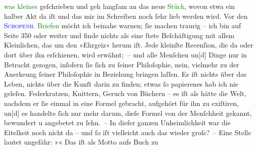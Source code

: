                   \textcolor{green}{was kleines}{} geſchrieben und
               geh langſam an das neue \textcolor{green}{Stück}{},
               wovon etwa ein halber Akt da iſt und das mir im Schreiben noch ſehr lieb werden
               wird.\pend
           \pstart
           {\pb}Vor den \textcolor{blue}{\textsc{Schopenh}}{}\ledrightnote{\textcolor{blue}{Arthur Schopenhauer}}. \textcolor{green}{Briefen}{}\ledrightnote{\textcolor{green}{Schopenhauer-Briefe}} möcht ich beinahe warnen; ſie machen
               traurig – ich bin auf Seite 350 oder weiter und finde nichts als eine ſtete
               Beſchäftigung mit allem Kleinlichen, das um den »Ehrgeiz« herum iſt. Jede kleinſte
               Recenſion, die da oder dort über ihn erſchienen, wird erwähnt; – und alle Menſchen
                  un{[}d{]} Dinge nur in Betracht gezogen, inſofern ſie ſich zu
               ſeiner Philoſophie, nein, vielmehr zu der Anerke{\geminationn}ung
               ſeiner Philoſophie in Beziehung bringen laſſen. Es iſt nichts über das Leben, nichts
               über die Kunſt darin zu {\pb}finden; etwas ſo papierenes hab
               ich nie geleſen. Federkratzen, Knittern, Geruch von Büchern – es iſt als hätte die
               Welt, nachdem er ſie einmal in eine Formel gebracht, aufgehört für ihn zu exiſtiren,
                  un{[}d{]} es handelte ſich nur mehr darum, dieſe Formel von der
               Menſchheit gekannt, bewundert u angebetet zu ſehn. – In dieſer ganzen Unheimlichkeit
               war die Eitelkeit noch nicht da – und ſo iſt vielleicht auch das wieder groſs? – Eine
               Stelle lautet ungefähr: »\label{K_L00467_1v}\label{K_L00467_1h}« Das iſt als Motto aufs Buch zu

